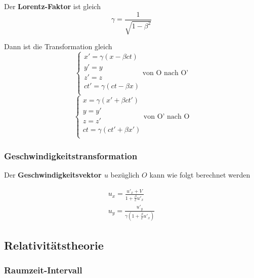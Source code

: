 \documentclass[7pt]{article}
\begin{document}
\begin{multicols*}{3}
Der \textbf{Lorentz-Faktor} ist gleich
\begin{equation*}
	\gamma = \frac{1}{\sqrt{1-\beta^2}}
\end{equation*}

Dann ist die Transformation gleich
\begin{equation*}
		\left\{
		\begin{array}{ll}
        	x' = \gamma(x - \beta ct) \\
            y' = y \\
            z' = z \\
            ct' = \gamma(ct - \beta x) \\
		\end{array}
	\right.
	\text{von O nach O'}
\end{equation*}
\begin{equation*}
		\left\{
		\begin{array}{ll}
        	x = \gamma(x' + \beta ct') \\
            y = y' \\
            z = z' \\
            ct = \gamma(ct' + \beta x') \\
		\end{array}
	\right.
	\text{von O' nach O}
\end{equation*}

\subsubsection{Geschwindigkeitstransformation}

Der \textbf{Geschwindigkeitsvektor $u$} bez{\"u}glich $O$ kann wie folgt berechnet werden

\begin{equation*}
	\begin{array}{ll}
		u_x = \frac{u'_x + V}{1 + \frac{\beta}{c}u'_x} \\
		u_y = \frac{u'_y}{\gamma(1+\frac{\beta}{c}u'_x)}
	\end{array}
\end{equation*}

\subsection{Relativit{\"a}tstheorie}

\subsubsection{Raumzeit-Intervall}


\end{multicols*}
\end{document}
